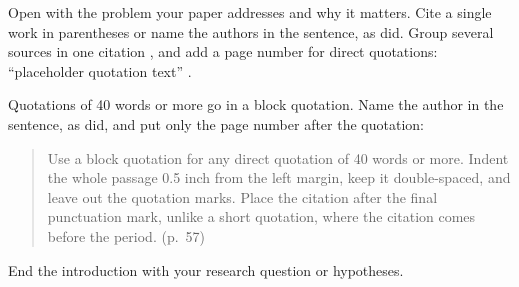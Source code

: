 
Open with the problem your paper addresses and why it matters. Cite a
single work in parentheses \parencite{smith2021} or name the authors in
the sentence, as \textcite{nguyen2019} did. Group several sources in one
citation \parencite{smith2021,nguyen2019,who2023}, and add a page number
for direct quotations: \enquote{placeholder quotation text}
\parencite[p.~42]{nguyen2019}.

Quotations of 40 words or more go in a block quotation. Name the author
in the sentence, as \textcite{nguyen2019} did, and put only the page
number after the quotation:

\begin{quote}
Use a block quotation for any direct quotation of 40 words or more. Indent
the whole passage 0.5 inch from the left margin, keep it double-spaced, and
leave out the quotation marks. Place the citation after the final
punctuation mark, unlike a short quotation, where the citation comes before
the period. (p.~57)
\end{quote}

End the introduction with your research question or hypotheses.
